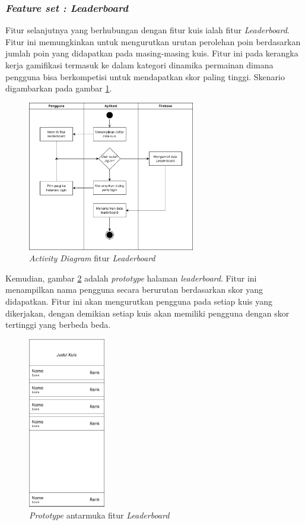 \subsubsection{\textit{Feature set : Leaderboard}}
Fitur selanjutnya yang berhubungan dengan fitur kuis ialah fitur \textit{Leaderboard}. 
Fitur ini memungkinkan untuk mengurutkan urutan perolehan poin berdasarkan jumlah poin yang didapatkan pada masing-masing kuis.
Fitur ini pada kerangka kerja gamifikasi termasuk ke dalam kategori dinamika permainan dimana pengguna bisa berkompetisi untuk mendapatkan skor paling tinggi.
Skenario digambarkan pada gambar \ref*{Fig:ActivityLeaderboard}.
\begin{figure}[H]
	\centering
	\includegraphics[width=0.65\textwidth]{contents/chapter-3/images/AD-leaderboard.png}
	\caption{\textit{Activity Diagram} fitur \textit{Leaderboard}}
	\label{Fig:ActivityLeaderboard}
\end{figure}
Kemudian, gambar \ref*{Fig:ActivityLeaderboard2} adalah \textit{prototype} halaman \textit{leaderboard}.
Fitur ini menampilkan nama pengguna secara berurutan berdasarkan skor yang didapatkan.
Fitur ini akan mengurutkan pengguna pada setiap kuis yang dikerjakan, dengan demikian setiap kuis akan memiliki pengguna dengan skor tertinggi yang berbeda beda.
\begin{figure}[H]
	\centering
	\includegraphics[width=0.3\textwidth]{contents/chapter-3/images/MF-leaderboard.png}
	\caption{\textit{Prototype} antarmuka fitur \textit{Leaderboard}}
	\label{Fig:ActivityLeaderboard2}
\end{figure}
